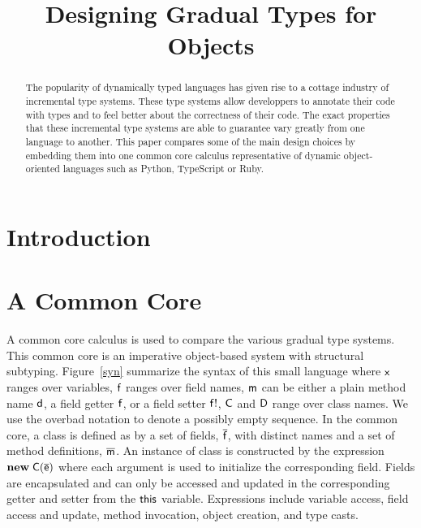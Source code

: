 \documentclass[preprint]{sigplanconf}
\newcommand{\m}{\M{\xt{m}}}
\newcommand{\e}{\M{\xt{e}}}
\renewcommand{\d}{\M{\xt{d}}}
\newcommand{\f}{\M{\xt{f}}}
\newcommand{\fb}{\M{\xt{f!}}}
\newcommand{\x}{\M{\xt{x}}}
\newcommand{\C}{\M{\xt{C}}}
\newcommand{\D}{\M{\xt{D}}}
\newcommand{\this}{\M{\xt{this}}}
\renewcommand{\d}{\M{\xt{d}}}
\newcommand{\new}{\M{\bt{new}}}
\newcommand{\New}[2]{\M{\new\;#1({#2})}}
\newcommand{\M}[1]{\ensuremath{#1}\xspace}
\newcommand{\xt}[1]{\sf{#1}}
\newcommand{\bt}[1]{\xt{\bf #1}}
\renewcommand{\b}[1]{\M{\overline{#1}}}
\begin{document}
\title{Designing Gradual Types for Objects} 
\maketitle

\begin{abstract}
The popularity of dynamically typed languages has given rise to a cottage
industry of incremental type systems. These type systems allow developpers
to annotate their code with types and to feel better about the correctness
of their code.  The exact properties that these incremental type systems are
able to guarantee vary greatly from one language to another. This paper
compares some of the main design choices by embedding them into one common
core calculus representative of dynamic object-oriented languages such as
Python, TypeScript or Ruby.
\end{abstract} 

\section{Introduction}

\newpage

\section{A Common Core}

A common core calculus is used to compare the various gradual type
systems. This common core is an imperative object-based system with
structural subtyping. Figure~\ref{syn} summarize the syntax of this small
language where \x ranges over variables, \f ranges over field names, \m can
be either a plain method name \d, a field getter \f, or a field setter \fb,
\C and \D range over class names. We use the overbad notation to denote a
possibly empty sequence. In the common core, a class is defined as by a set
of fields, \b\f, with distinct names and a set of method definitions,
\b\m. An instance of class is constructed by the expression \New\C{\b\e} where
each argument is used to initialize the corresponding field. Fields are
encapsulated and can only be accessed and updated in the corresponding
getter and setter from the \this variable.  Expressions include variable
access, field access and update, method invocation, object creation, and
type casts.
\end{document}
